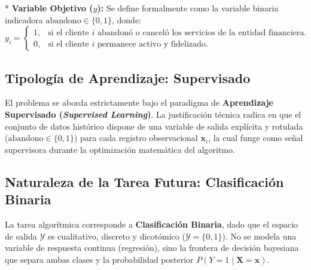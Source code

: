 \documentclass[12pt,a4paper]{article}
\begin{document}
* \textbf{Variable Objetivo ($y$):} Se define formalmente como la variable binaria indicadora $\text{abandono} \in \{0, 1\}$, donde:
  \begin{equation}
      y_i = \begin{cases} 
      1, & \text{si el cliente $i$ abandonó o canceló los servicios de la entidad financiera.} \\
      0, & \text{si el cliente $i$ permanece activo y fidelizado.}
      \end{cases}
  \end{equation}

\subsection{Tipología de Aprendizaje: Supervisado}
El problema se aborda estrictamente bajo el paradigma de \textbf{Aprendizaje Supervisado (\textit{Supervised Learning})}. La justificación técnica radica en que el conjunto de datos histórico dispone de una variable de salida explícita y rotulada ($\text{abandono} \in \{0, 1\}$) para cada registro observacional $\mathbf{x}_i$, la cual funge como señal supervisora durante la optimización matemática del algoritmo.

\subsection{Naturaleza de la Tarea Futura: Clasificación Binaria}
La tarea algorítmica corresponde a \textbf{Clasificación Binaria}, dado que el espacio de salida $\mathcal{Y}$ es cualitativo, discreto y dicotómico ($\mathcal{Y} = \{0, 1\}$). No se modela una variable de respuesta continua (regresión), sino la frontera de decisión bayesiana que separa ambas clases y la probabilidad posterior $P(Y=1 \mid \mathbf{X}=\mathbf{x})$.
\end{document}
